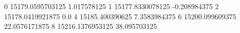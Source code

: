 0 15179.0595703125 1.017578125
1 15177.8330078125 -0.208984375
2 15178.0419921875 0.0
4 15185.400390625 7.3583984375
6 15200.099609375 22.0576171875
8 15216.1376953125 38.095703125
